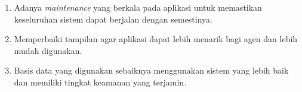 \begin{enumerate}[nolistsep]

  \item Adanya \textit{maintenance} yang berkala pada aplikasi untuk memastikan keseluruhan sistem dapat berjalan dengan semestinya.

  \item Memperbaiki tampilan agar aplikasi dapat lebih menarik bagi agen dan lebih mudah digunakan.

  \item Basis data yang digunakan sebaiknya menggunakan sistem yang lebih baik dan memiliki tingkat keamanan yang terjamin.

\end{enumerate}
